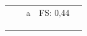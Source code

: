 \begin{table}[H]
\begin{tabular*}{\columnwidth}{@{\extracolsep{\fill}}clcrl}
                                               &                                                                                                            & a          & FS: 0,44         &                                                                                                                                                                                                                                                                                                                                                                                                                                                                           \\
                                               &                                                                                                            &            &                  &                                                                                                                                                                                                                                                                                                                                                                                                                                                                           \\
                                               &                                                                                                            &            &                  &                                                                                                                                                                                                                                                                                                                                                                                                                                                                           \\
                                               &                                                                                                            &            &                  &                                                                                                                                                                                                                                                                                                                                                                                                                                                                           \\

\end{tabular*}
\end{table}
